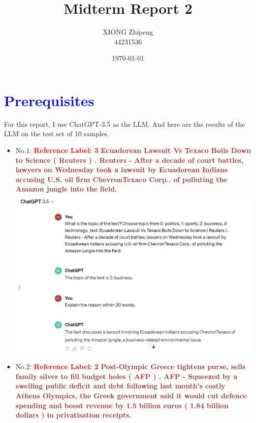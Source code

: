 \documentclass{article}
\title{Midterm Report 2}
\author{XIONG Zhipeng\\44231536}
\date{\today}
\begin{document}
\maketitle

\section{\textcolor{blue}{Prerequisites}\\}
For this report, I use ChatGPT-3.5 as the LLM. 
And here are the results of the LLM on the test set of 10 samples.\\
\begin{itemize}
    \item No.1: \textcolor{red}{\textbf{Reference Label: 3}} 
    \textcolor{brown}{\textbf{Ecuadorean Lawsuit Vs Texaco Boils Down to Science ( Reuters ) . Reuters - After a decade of court battles, lawyers on Wednesday took a lawsuit by Ecuadorean Indians accusing U.S. oil firm ChevronTexaco Corp.. of polluting the Amazon jungle into the field.}}\\
    \includegraphics[width=\textwidth]{Q1.png}
    \item No.2: \textcolor{red}{\textbf{Reference Label: 2}}
    \textcolor{brown}{\textbf{Post-Olympic Greece tightens purse, sells family silver to fill budget holes ( AFP ) . AFP - Squeezed by a swelling public deficit and debt following last month's costly Athens Olympics, the Greek government said it would cut defence spending and boost revenue by 1.5 billion euros ( 1.84 billion dollars ) in privatisation receipts.}}\\

\end{itemize}
\end{document}
